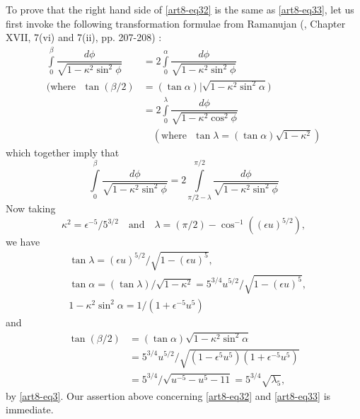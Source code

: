 To prove that the right hand side of \eqref{art8-eq32} is the same as \eqref{art8-eq33}, let us first invoke the following transformation formulae from Ramanujan (\cite{art8-key10}, Chapter XVII, 7(vi) and 7(ii), pp. 207-208) :
\begin{align*}
\int\limits^{\beta}_{0}\dfrac{d\phi}{\sqrt{1-\kappa^{2}\sin^{2}\phi}} &=2\int\limits^{\alpha}_{0}\dfrac{d\phi}{\sqrt{1-\kappa^{2}\sin^{2}\phi}}\\
(\text{where~ }\tan(\beta/2) &= (\tan\alpha)|\sqrt{1-\kappa^{2}\sin^{2}\alpha})\\
&=2\int\limits^{\lambda}_{0}\dfrac{d\phi}{\sqrt{1-\kappa^{2}\cos^{2}\phi}}\\
&\quad (\text{where~ }\tan\lambda=(\tan\alpha)\sqrt{1-\kappa^{2}})
\end{align*}\pageoriginale
which together imply that
\begin{equation}
\int\limits^{\beta}_{0}\dfrac{d\phi}{\sqrt{1-\kappa^{2}\sin^{2}\phi}}=2\int\limits^{\pi/2}_{\pi/2-\lambda}\dfrac{d\phi}{\sqrt{1-\kappa^{2}\sin^{2}\phi}}\label{art8-eq36}
\end{equation}
Now taking 
$$
\kappa^{2}=\epsilon^{-5}/5^{3/2}\quad\text{and}\quad\lambda=(\pi/2)-\cos^{-1}((\epsilon u)^{5/2}),
$$ 
we have 
\begin{align*}
& \tan \lambda=(\epsilon u)^{5/2}/\sqrt{1-(\epsilon u)^{5}},\\
& \tan\alpha=(\tan\lambda)/\sqrt{1-\kappa^{2}}=5^{3/4}u^{5/2}/\sqrt{1-(\epsilon u)^{5}},\\
& 1-\kappa^{2}\sin^{2}\alpha=1/(1+\epsilon^{-5}u^{5})
\end{align*}
and 
\begin{align*}
\tan(\beta/2) &=(\tan\alpha)\sqrt{1-\kappa^{2}\sin^{2}\alpha}\\
 &=5^{3/4}u^{5/2}/\sqrt{(1-\epsilon^{5}u^{5})(1+\epsilon^{-5}u^{5})}\\
&=5^{3/4}/\sqrt{u^{-5}-u^{5}-11}=5^{3/4}\sqrt{\lambda_{5}},
\end{align*}
by \eqref{art8-eq3}. Our assertion above concerning \eqref{art8-eq32} and \eqref{art8-eq33} is immediate.

